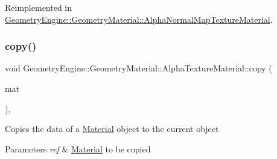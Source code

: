 Reimplemented in \mbox{\hyperlink{class_geometry_engine_1_1_geometry_material_1_1_alpha_normal_map_texture_material_a4dff732a06c94a7761a054ca62dbd491}{Geometry\+Engine\+::\+Geometry\+Material\+::\+Alpha\+Normal\+Map\+Texture\+Material}}.

\mbox{\label{class_geometry_engine_1_1_geometry_material_1_1_alpha_texture_material_a30869b528be940b9041707570459dcdf}} 
\subsubsection{\texorpdfstring{copy()}{copy()}}
{\footnotesize\ttfamily void Geometry\+Engine\+::\+Geometry\+Material\+::\+Alpha\+Texture\+Material\+::copy (\begin{DoxyParamCaption}\item[{const \mbox{\hyperlink{class_geometry_engine_1_1_geometry_material_1_1_alpha_texture_material}{Alpha\+Texture\+Material}} \&}]{mat }\end{DoxyParamCaption})\hspace{0.3cm}{\ttfamily [protected]}, {\ttfamily [virtual]}}

Copies the data of a \mbox{\hyperlink{class_geometry_engine_1_1_geometry_material_1_1_material}{Material}} object to the current object 
\begin{DoxyParams}{Parameters}
{\em ref} & \mbox{\hyperlink{class_geometry_engine_1_1_geometry_material_1_1_material}{Material}} to be copied \\
\hline
\end{DoxyParams}
\mbox{\label{class_geometry_engine_1_1_geometry_material_1_1_alpha_texture_material_a4080f2353ed87dc47589ac5568f48c43}} 

